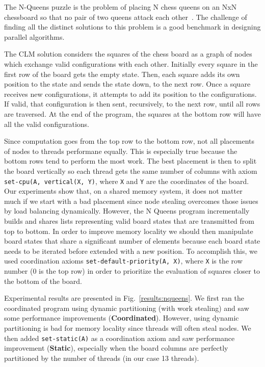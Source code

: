 The N-Queens puzzle is the problem of placing N chess queens on an NxN
chessboard so that no pair of two queens attack each
other~\cite{8queens}. The challenge of finding all the
distinct solutions to this problem is a good benchmark in designing
parallel algorithms.

The CLM solution considers the squares of the chess board as a graph
of nodes which exchange valid configurations with each
other. Initially every square in the first row of the board gets the
empty state.  Then, each square adds its own position to the state and
sends the state down, to the next row. Once a square receives new
configurations, it attempts to add its position to the
configurations. If valid, that configuration is then sent,
recursively, to the next row, until all rows are traversed. At the end
of the program, the squares at the bottom row will have all the valid
configurations.

Since computation goes from the top row to the bottom row, not all
placements of nodes to threads performane equally. This is especially
true because the bottom rows tend to perform the most work. The best
placement is then to split the board vertically so each thread gets
the same number of columns with axiom \texttt{set-cpu(A, vertical(X, Y)}, where
\texttt{X} and \texttt{Y} are the coordinates of the board. Our experiments show that, on a shared
memory system, it does not matter much if we start with a bad
placement since node stealing overcomes those issues by load balancing
dynamically.  However, the N Queens program incrementally builds and shares lists representing
valid board states that are transmitted from top to bottom.
In order to improve memory locality we should then manipulate board
states that share a significant number of elements because each board state
needs to be iterated before extended with a new position.
To accomplish this, we used coordination axioms \texttt{set-default-priority(A,
X)}, where \texttt{X} is the row number (0 is the top row) in order to
prioritize the evaluation of squares closer to the bottom of the board.

Experimental results are presented in Fig.~\ref{results:nqueens}.  We
first ran the coordinated program using dynamic partitioning (with
work stealing) and saw some performance improvements
(\textbf{Coordinated}). However, using dynamic partitioning is bad for
memory locality since threads will often steal nodes.  We then
added \texttt{set-static(A)} as a coordination axiom and saw
performance improvement (\textbf{Static}), especially when the board
columns are perfectly partitioned by the number of threads (in our
case 13 threads).


